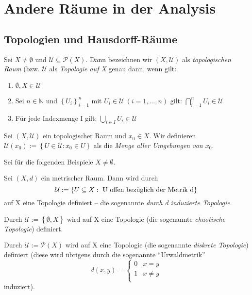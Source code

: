 \documentclass[10pt]{scrbook}
\begin{document}
\section{Andere Räume in der Analysis}

\subsection{Topologien und Hausdorff-Räume}

\begin{Def}
Sei $X\neq \emptyset$ und $\mathcal{U} \subseteq \mathcal{P}(X)$. Dann bezeichnen wir $(X, \mathcal{U})$ als \emph{topologischen Raum} (bzw. $\mathcal{U}$ als \emph{Topologie auf X} genau dann, wenn gilt:
\begin{enumerate}
	\item $\emptyset, X\in \mathcal{U}$
	\item Sei $n\in \mathbb{N}$ und $\left\{U_i\right\}_{i=1}^n$ mit $U_i\in\mathcal{U}\ (i=1, \ldots, n)$ gilt: $\bigcap_{i=1}^n U_i\in \mathcal{U}$
	\item Für jede Indexmenge I gilt: $\bigcup_{i\in I} U_i\in \mathcal{U}$
\end{enumerate}
\end{Def}

\begin{Def}
Sei $(X, \mathcal{U})$ ein topologischer Raum und $x_0\in X$. Wir definieren $\mathcal{U}(x_0):=\left\{U\in \mathcal{U}: x_0\in U\right\}$ als die \emph{Menge aller Umgebungen von $x_0$}.
\end{Def}

Sei für die folgenden Beispiele $X\neq \emptyset$.

\begin{Bsp}
Sei $(X, d)$ ein metrischer Raum. Dann wird durch 
\begin{displaymath}
\mathcal{U}:=\left\{U\subseteq X:\ \textnormal{U offen bezüglich der Metrik d}\right\}
\end{displaymath} auf X eine Topologie definiert -- die sogenannte \emph{durch d induzierte Topologie}.
\end{Bsp}

\begin{Bsp}
Durch $\mathcal{U}:=\left\{\emptyset, X\right\}$ wird auf X eine Topologie (die sogenannte \emph{chaotische Topologie}) definiert.
\end{Bsp}

\begin{Bsp}
Durch $\mathcal{U}:=\mathcal{P}(X)$ wird auf X eine Topologie (die sogenannte \emph{diskrete Topologie}) definiert (diese wird übrigens durch die sogenannte "`Urwaldmetrik"'
\begin{displaymath}
	d(x, y)=\begin{cases}
0 & x=y\\
1 & x\neq y\\
\end{cases}
\end{displaymath}
induziert).
\end{Bsp}
\end{document}
